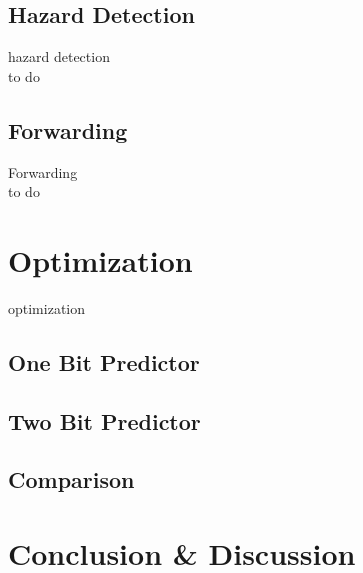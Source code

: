 \documentclass[12pt]{IEEEtran}
\begin{document}
\subsection{Hazard Detection}
\label{sub:hazard_detection}

hazard detection\\
to do

\subsection{Forwarding} 
\label{sub:forwarding}
Forwarding\\
to do

\section{Optimization} 
\label{sec:optimization}
optimization

\subsection{One Bit Predictor} 
\label{sec:1_bit_predictor}


\subsection{Two Bit Predictor} 
\label{sub:2_bit_predictor}


\subsection{Comparison} 
\label{sub:comparison}


\section{Conclusion \& Discussion}
\end{document}
